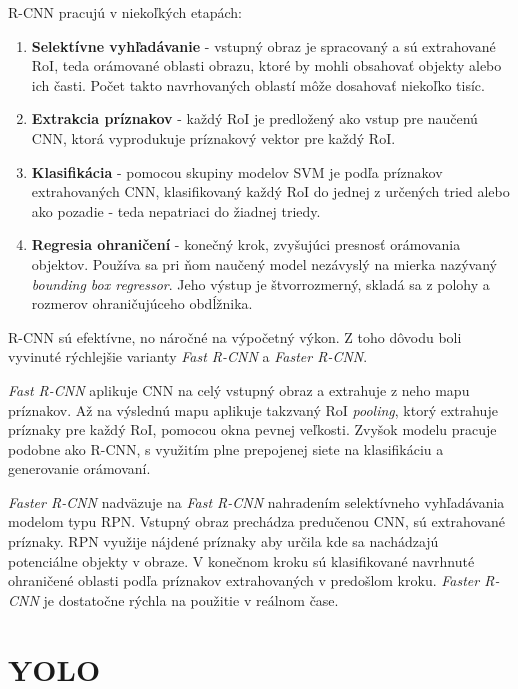         \ac{R-CNN} pracujú v niekoľkých etapách:
        \begin{enumerate}
            \item \textbf{Selektívne vyhľadávanie} - vstupný obraz je spracovaný a sú extrahované \ac{RoI}, teda orámované oblasti obrazu, ktoré by mohli obsahovať objekty alebo ich časti. Počet takto navrhovaných oblastí môže dosahovať niekoľko tisíc.
            \item \textbf{Extrakcia príznakov} - každý \ac{RoI} je predložený ako vstup pre naučenú \ac{CNN}, ktorá vyprodukuje príznakový vektor pre každý \ac{RoI}.
            \item \textbf{Klasifikácia} - pomocou skupiny modelov \ac{SVM} je podľa príznakov extrahovaných \ac{CNN}, klasifikovaný každý \ac{RoI} do jednej z určených tried alebo ako pozadie - teda nepatriaci do žiadnej triedy.
            \item \textbf{Regresia ohraničení} - konečný krok, zvyšujúci presnosť orámovania objektov. Používa sa pri ňom naučený model nezávyslý na mierka nazývaný \emph{bounding box regressor}. Jeho výstup je štvorrozmerný, skladá sa z polohy a rozmerov ohraničujúceho obdĺžnika.
        \end{enumerate}

        \ac{R-CNN} sú efektívne, no náročné na výpočetný výkon. Z toho dôvodu boli vyvinuté rýchlejšie varianty \emph{Fast R-CNN} a \emph{Faster R-CNN}.

        \emph{Fast R-CNN} aplikuje \ac{CNN} na celý vstupný obraz a extrahuje z neho mapu príznakov. Až na výslednú mapu aplikuje takzvaný \ac{RoI} \emph{pooling}, ktorý extrahuje príznaky pre každý \ac{RoI}, pomocou okna pevnej veľkosti. Zvyšok modelu pracuje podobne ako \ac{R-CNN}, s využitím plne prepojenej siete na klasifikáciu a generovanie orámovaní.

        \emph{Faster R-CNN} nadväzuje na \emph{Fast R-CNN} nahradením selektívneho vyhľadávania modelom typu \ac{RPN}. Vstupný obraz prechádza predučenou \ac{CNN}, sú extrahované príznaky. \ac{RPN} využije nájdené príznaky aby určila kde sa nachádzajú potenciálne objekty v obraze. V konečnom kroku sú klasifikované navrhnuté ohraničené oblasti podľa príznakov extrahovaných v predošlom kroku. \emph{Faster R-CNN} je dostatočne rýchla na použitie v reálnom čase.

    \section{YOLO}

